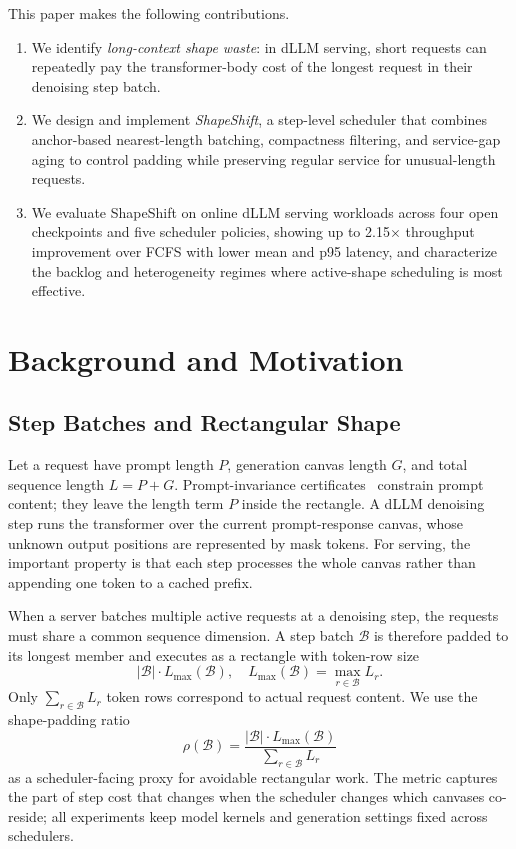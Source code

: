 \documentclass[a4paper]{llncs}
\begin{document}
This paper makes the following contributions.

\begin{enumerate}
  \item We identify \emph{long-context shape waste}: in dLLM serving, short requests can repeatedly pay the transformer-body cost of the longest request in their denoising step batch.
  \item We design and implement \emph{ShapeShift}, a step-level scheduler that combines anchor-based nearest-length batching, compactness filtering, and service-gap aging to control padding while preserving regular service for unusual-length requests.
  \item We evaluate ShapeShift on online dLLM serving workloads across four open checkpoints and five scheduler policies, showing up to 2.15$\times$ throughput improvement over FCFS with lower mean and p95 latency, and characterize the backlog and heterogeneity regimes where active-shape scheduling is most effective.
\end{enumerate}

\section{Background and Motivation}

\subsection{Step Batches and Rectangular Shape}

Let a request have prompt length $P$, generation canvas length $G$, and total sequence length $L=P+G$. Prompt-invariance certificates~\cite{zhang2026pi} constrain prompt content; they leave the length term $P$ inside the rectangle. A dLLM denoising step runs the transformer over the current prompt-response canvas, whose unknown output positions are represented by mask tokens. For serving, the important property is that each step processes the whole canvas rather than appending one token to a cached prefix.

When a server batches multiple active requests at a denoising step, the requests must share a common sequence dimension. A step batch $\mathcal{B}$ is therefore padded to its longest member and executes as a rectangle with token-row size
\[
  |\mathcal{B}|\cdot L_{\max}(\mathcal{B}), \quad
  L_{\max}(\mathcal{B})=\max_{r\in\mathcal{B}} L_r .
\]
Only $\sum_{r\in\mathcal{B}} L_r$ token rows correspond to actual request content. We use the shape-padding ratio
\[
  \rho(\mathcal{B}) =
  \frac{|\mathcal{B}|\cdot L_{\max}(\mathcal{B})}
       {\sum_{r\in\mathcal{B}} L_r}
\]
as a scheduler-facing proxy for avoidable rectangular work. The metric captures the part of step cost that changes when the scheduler changes which canvases co-reside; all experiments keep model kernels and generation settings fixed across schedulers.
\end{document}
